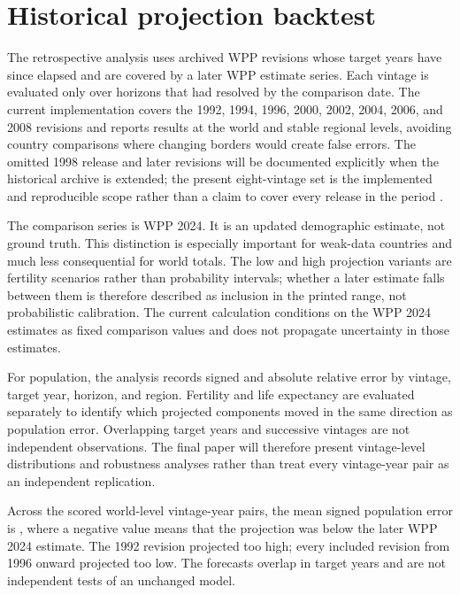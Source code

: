 \section{Historical projection backtest}

The retrospective analysis uses archived WPP revisions whose target years have
since elapsed and are covered by a later WPP estimate series. Each vintage is
evaluated only over horizons that had resolved by the comparison date. The
current implementation covers the 1992, 1994, 1996, 2000, 2002, 2004, 2006,
and 2008 revisions and reports results at the world and stable regional levels,
avoiding country comparisons where changing borders would create false errors.
The omitted 1998 release and later revisions will be documented explicitly
when the historical archive is extended; the present eight-vintage set is the
implemented and reproducible scope rather than a claim to cover every release
in the period \citep{unwpparchives}.

The comparison series is WPP 2024. It is an updated demographic estimate, not
ground truth. This distinction is especially important for weak-data countries
and much less consequential for world totals. The low and high projection
variants are fertility scenarios rather than probability intervals; whether a
later estimate falls between them is therefore described as inclusion in the
printed range, not probabilistic calibration.
The current calculation conditions on the WPP 2024 estimates as fixed
comparison values and does not propagate uncertainty in those estimates.

For population, the analysis records signed and absolute relative error by
vintage, target year, horizon, and region. Fertility and life expectancy are
evaluated separately to identify which projected components moved in the same
direction as population error. Overlapping target years and successive
vintages are not independent observations. The final paper will therefore
present vintage-level distributions and robustness analyses rather than treat
every vintage-year pair as an independent replication.

Across the scored world-level vintage-year pairs, the mean signed population
error is \BacktestWorldMeanSignedError, where a negative value means that the
projection was below the later WPP 2024 estimate. The 1992 revision projected
too high; every included revision from 1996 onward projected too low. The
forecasts overlap in target years and are not independent tests of an unchanged
model.

